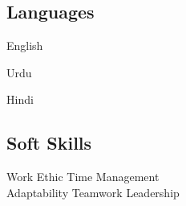 \documentclass[]{deedy-resume-openfont}
\begin{document}
\begin{minipage}[t]{0.33\textwidth}
    \subsection{Languages}
    \vspace{\topsep}
    \begin{tightemize}
        \item English
        \item Urdu
        \item Hindi
    \end{tightemize}
    \sectionsep

    \subsection{Soft Skills}
    Work Ethic \textbullet{} Time Management \\ Adaptability \textbullet{}  Teamwork \textbullet{} Leadership \\



\end{minipage}
\hfill
\end{document}
